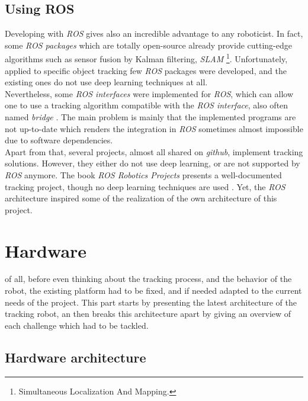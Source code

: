 		
		\section{Using ROS}
		
		Developing with \textit{ROS} gives also an incredible
		advantage to any roboticist. In fact, some \textit{ROS packages}
		which are totally open-source already provide cutting-edge algorithms
		such as sensor fusion by Kalman filtering, \textit{SLAM}
		\footnote{Simultaneous Localization And Mapping.}. Unfortunately, 
		applied to specific object tracking few \textit{ROS} packages were developed, and
		the existing ones do not use deep learning techniques at all.
		\\\indent Nevertheless, some \textit{ROS interfaces} were implemented
		for \textit{ROS}, which can allow one to use a tracking algorithm
		compatible with the \textit{ROS interface}, also often named
		\textit{bridge} \cite{mtf}. The main problem is mainly that the implemented
		programs are not up-to-date which renders the integration
		in \textit{ROS} sometimes almost impossible due to software dependencies.
		\\\indent Apart from that, several projects, almost all shared on
		\textit{github}, implement tracking solutions. However, they 
		either do not use deep learning, or are not supported by \textit{ROS} 
		anymore. The book \textit{ROS Robotics Projects} presents
		a well-documented tracking project, though no
		deep learning techniques are used \cite{rosprojects}. Yet, 
		the \textit{ROS} architecture inspired some of the realization 
		of the own architecture of this project.


\chapter{Hardware}\label{hardware}

 of all, before even thinking about the tracking process, and
the behavior of the robot, the existing platform had to be fixed, and if needed adapted
to the current needs of the project. This part starts by presenting the latest architecture 
of the tracking robot, an then breaks this architecture apart by giving an overview of
each challenge which had to be tackled.
	
	\section{Hardware architecture}
		
